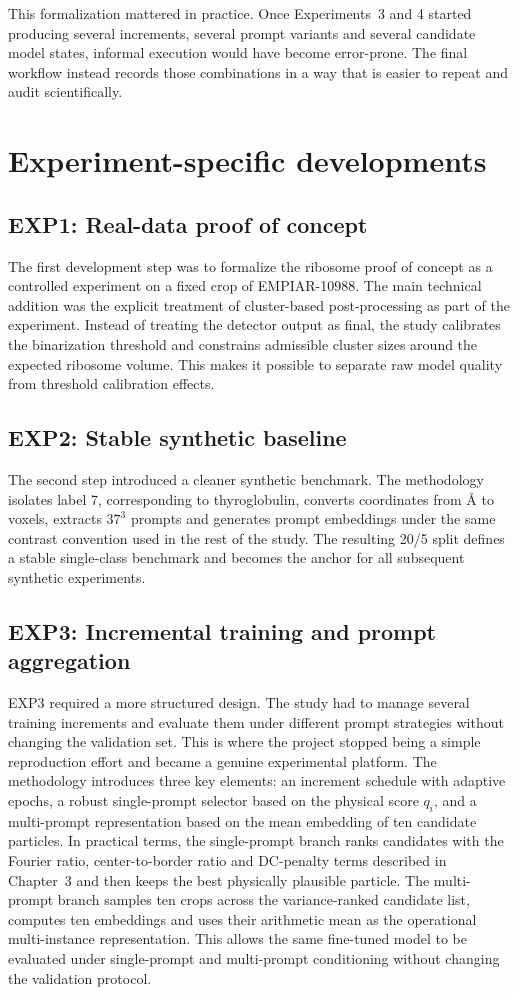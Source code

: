 \documentclass[12pt,a4paper]{report}
\begin{document}
This formalization mattered in practice. Once Experiments~3 and 4 started producing several increments, several prompt variants and several candidate model states, informal execution would have become error-prone. The final workflow instead records those combinations in a way that is easier to repeat and audit scientifically.

\section{Experiment-specific developments}

\subsection{EXP1: Real-data proof of concept}
The first development step was to formalize the ribosome proof of concept as a controlled experiment on a fixed crop of EMPIAR-10988. The main technical addition was the explicit treatment of cluster-based post-processing as part of the experiment. Instead of treating the detector output as final, the study calibrates the binarization threshold and constrains admissible cluster sizes around the expected ribosome volume. This makes it possible to separate raw model quality from threshold calibration effects.

\subsection{EXP2: Stable synthetic baseline}
The second step introduced a cleaner synthetic benchmark. The methodology isolates label 7, corresponding to thyroglobulin, converts coordinates from \AA{} to voxels, extracts \(37^3\) prompts and generates prompt embeddings under the same contrast convention used in the rest of the study. The resulting 20/5 split defines a stable single-class benchmark and becomes the anchor for all subsequent synthetic experiments.

\subsection{EXP3: Incremental training and prompt aggregation}
EXP3 required a more structured design. The study had to manage several training increments and evaluate them under different prompt strategies without changing the validation set. This is where the project stopped being a simple reproduction effort and became a genuine experimental platform. The methodology introduces three key elements: an increment schedule with adaptive epochs, a robust single-prompt selector based on the physical score \(q_i\), and a multi-prompt representation based on the mean embedding of ten candidate particles. In practical terms, the single-prompt branch ranks candidates with the Fourier ratio, center-to-border ratio and DC-penalty terms described in Chapter~3 and then keeps the best physically plausible particle. The multi-prompt branch samples ten crops across the variance-ranked candidate list, computes ten embeddings and uses their arithmetic mean as the operational multi-instance representation. This allows the same fine-tuned model to be evaluated under single-prompt and multi-prompt conditioning without changing the validation protocol.
\end{document}
